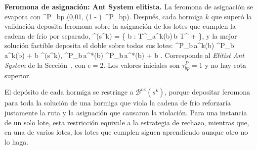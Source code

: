 {\bf Feromona de asignación: Ant System elitista.} La feromona de
asignación se evapora con
\startformula
	\tau^{P}_{bp} \leftarrow \max\left(0{,}01,\; (1 - \rho)\, \tau^{P}_{bp}\right).
\stopformula
Después, cada hormiga $k$ que superó la validación deposita feromona sobre la
asignación de los lotes que cumplen la cadena de frío por separado,
\startplaceformula[reference=eq:aco_cumplen]
\startformula
	^{}(s^k) = \left\{ b \in {} : T^{}_{a^k(b)\,b} \leq T^{} + \varepsilon \right\},
\stopformula
\stopplaceformula
y la mejor solución factible deposita el doble sobre todos sus lotes:
\startformula
	\startalign[n=2, align={right,left}]
		\NC \tau^{P}_{b\,a^k(b)} \NC \leftarrow \tau^{P}_{b\,a^k(b)} +  \qquad \forall b \in {}^{}(s^k), \NR
		\NC \tau^{P}_{b\,a^*(b)} \NC \leftarrow \tau^{P}_{b\,a^*(b)} +  \qquad \forall b \in {}. \NR
	\stopalign
\stopformula
Corresponde al {\em Elitist Ant System} de la Sección~,
con $e = 2$. Los valores iniciales son $\tau^{P}_{bp} = 1$ y no hay cota
superior.

El depósito de cada hormiga se restringe a $\mathcal{B}^{\text{ok}}(s^k)$,
porque depositar feromona para toda la solución de una hormiga que viola la
cadena de frío reforzaría justamente la ruta y la asignación que causaron la
violación. Para una instancia de un solo lote, esta restricción
equivale a la estrategia de rechazo, mientras que, en una de varios lotes,
los lotes que cumplen siguen aprendiendo aunque otro no lo haga.

\stopsubsection

\stopsection

\stopchapter
